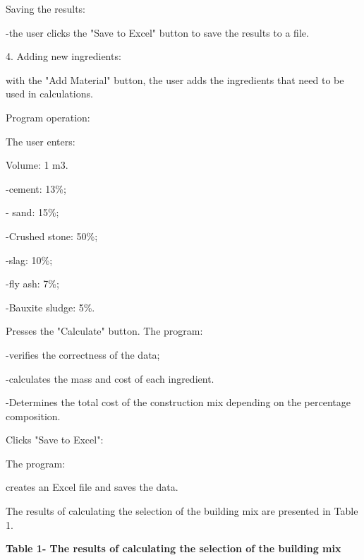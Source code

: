 \documentclass[
]{article}
\begin{document}
Saving the results:

-the user clicks the "Save to Excel" button to save the results to a
file.

4. Adding new ingredients:

with the "Add Material" button, the user adds the ingredients that need
to be used in calculations.

Program operation:

The user enters:

Volume: 1 m3.

-cement: 13\%;

- sand: 15\%;

-Crushed stone: 50\%;

-slag: 10\%;

-fly ash: 7\%;

-Bauxite sludge: 5\%.

Presses the "Calculate" button. The program:

-verifies the correctness of the data;

-calculates the mass and cost of each ingredient.

-Determines the total cost of the construction mix depending on the
percentage composition.

Clicks "Save to Excel":

The program:

creates an Excel file and saves the data.

The results of calculating the selection of the building mix are
presented in Table 1.

\textbf{Table 1- The results of calculating the selection of the
building mix}
\end{document}
